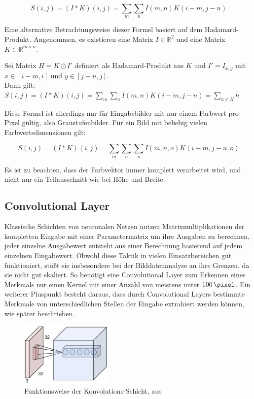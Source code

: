 \begin{equation}
S(i,j) = (I*K)(i,j) = \sum_{m}\sum_{n}I(m,n)K(i-m,j-n)
\end{equation}

Eine alternative Betrachtungsweise dieser Formel basiert auf dem Hadamard-Produkt. Angenommen, es existieren eine Matrix $I\in\mathbb{R}^{2}$ und eine Matrix $K\in\mathbb{R}^{m\times n}$.

Sei Matrix $H = K\odot I'$ definiert als Hadamard-Produkt aus $K$ und $I'=I_{x, y}$ mit $x\in[i-m,i]$ und $y\in[j-n,j]$.\\
Dann gilt: $S(i,j)=(I*K)(i,j) = \sum_{m}\sum_{n}I(m,n)K(i-m,j-n)=\sum_{h\in H}h$

Diese Formel ist allerdings nur für Eingabebilder mit nur einem Farbwert pro Pixel gültig, also Graustufenbilder. Für ein Bild mit beliebig vielen Farbwertsdimensionen gilt:

\begin{equation}
S(i,j) = (I*K)(i,j) = \sum_{m}\sum_{n}\sum_{o}I(m,n,o)K(i-m,j-n,o)
\end{equation}

Es ist zu beachten, dass der Farbvektor immer komplett verarbeitet wird, und nicht nur ein Teilausschnitt wie bei Höhe und Breite.

\subsection{Convolutional Layer}
\label{ssec:convlayer}

Klassische Schichten von neuronalen Netzen nutzen Matrixmultiplikationen der kompletten Eingabe mit einer Parametermatrix um ihre Ausgaben zu berechnen, \dahe jeder einzelne Ausgabewert entsteht aus einer Berechnung basierend auf jedem einzelnen Eingabewert. Obwohl diese Taktik in vielen Einsatzbereichen gut funktioniert, stößt sie insbesondere bei der Bilddatenanalyse an ihre Grenzen, da sie nicht gut skaliert. \cite{cs231n} So benötigt eine Convolutional Layer zum Erkennen eines Merkmals nur einen Kernel mit einer Anzahl von meistens unter $\SI{100}{\pixel}$. \cite{deeplearning_16} Ein weiterer Pluspunkt besteht daraus, dass durch Convolutional Layers bestimmte Merkmale von unterschiedlichen Stellen der Eingabe extrahiert werden können, wie später beschrieben.

\begin{figure}[H]
	\centering
	\includegraphics[width=0.4\textwidth,keepaspectratio]{images/cs231n/convolutional.jpg}
	\caption{Funktionsweise der Konvolutions-Schicht, aus \cite{cs231n}}
	\label{fig:convolutional}
\end{figure}

